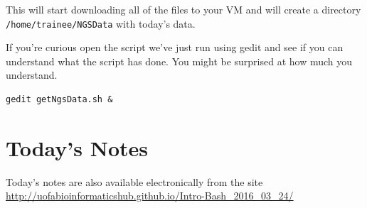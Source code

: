 This will start downloading all of the files to your VM and will create a directory \texttt{/home/trainee/NGSData} with today's data.

\begin{advanced}
If you're curious open the script we've just run using gedit and see if you can understand what the script has done.
You might be surprised at how much you understand.
\begin{lstlisting}
gedit getNgsData.sh &
\end{lstlisting}
\end{advanced}

\section{Today's Notes}
Today's notes are also available electronically from the site \url{http://uofabioinformaticshub.github.io/Intro-Bash\_2016\_03\_24/}